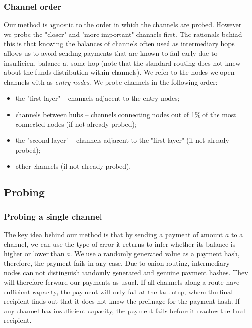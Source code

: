 \subsubsection{Channel order}
Our method is agnostic to the order in which the channels are probed.
However we probe the "closer" and "more important" channels first.
The rationale behind this is that knowing the balances of channels often used as intermediary hops allows us to avoid sending payments that are known to fail early due to insufficient balance at some hop (note that the standard routing does not know about the funds distribution within channels).
We refer to the nodes we open channels with as \textit{entry nodes}.
We probe channels in the following order:

\begin{itemize}
	\item the "first layer" -- channels adjacent to the entry nodes;
	\item channels between hubs -- channels connecting nodes out of 1\% of the most connected nodes (if not already probed);
	\item the "second layer" -- channels adjacent to the "first layer" (if not already probed);
	\item other channels (if not already probed).
\end{itemize}


\subsection{Probing}

\subsubsection{Probing a single channel}
The key idea behind our method is that by sending a payment of amount $a$ to a channel, we can use the type of error it returns to infer whether its balance is higher or lower than $a$.
We use a randomly generated value as a payment hash, therefore, the payment fails in any case.
Due to onion routing, intermediary nodes can not distinguish randomly generated and genuine payment hashes.
They will therefore forward our payments as usual.
If all channels along a route have sufficient capacity, the payment will only fail at the last step, where the final recipient finds out that it does not know the preimage for the payment hash.
If any channel has insufficient capacity, the payment fails before it reaches the final recipient.

